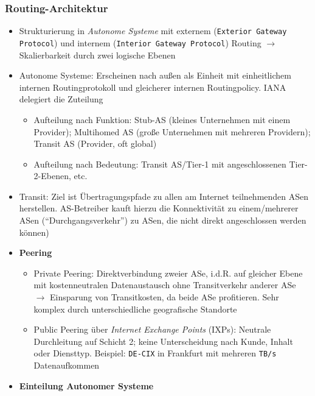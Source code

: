 \subsubsection{Routing-Architektur}
\begin{itemize}
	\item Strukturierung in \textit{Autonome Systeme} mit externem (\texttt{Exterior Gateway Protocol}) und internem (\texttt{Interior Gateway Protocol}) Routing \(\rightarrow\) Skalierbarkeit durch zwei logische Ebenen
	\item Autonome Systeme: Erscheinen nach außen als Einheit mit einheitlichem internen Routingprotokoll und gleicherer internen Routingpolicy. IANA delegiert die Zuteilung
	\begin{itemize}
		\item Aufteilung nach Funktion: Stub-AS (kleines Unternehmen mit einem Provider); Multihomed AS (große Unternehmen mit mehreren Providern); Transit AS (Provider, oft global)
		\item Aufteilung nach Bedeutung: Transit AS/Tier-1 mit angeschlossenen Tier-2-Ebenen, etc.
	\end{itemize}
	\item Transit: Ziel ist Übertragungspfade zu allen am Internet teilnehmenden ASen herstellen. AS-Betreiber kauft hierzu die Konnektivität zu einem/mehrerer ASen ("`Durchgangsverkehr"') zu ASen, die nicht direkt angeschlossen werden können)
	\item \textbf{Peering}
	\begin{itemize}
		\item Private Peering: Direktverbindung zweier ASe, i.d.R. auf gleicher Ebene mit kostenneutralen Datenaustausch ohne Transitverkehr anderer ASe \(\rightarrow\) Einsparung von Transitkosten, da beide ASe profitieren. Sehr komplex durch unterschiedliche geografische Standorte
		\item Public Peering über \textit{Internet Exchange Points} (IXPs): Neutrale Durchleitung auf Schicht 2; keine Unterscheidung nach Kunde, Inhalt oder Diensttyp. Beispiel: \texttt{DE-CIX} in Frankfurt mit mehreren \texttt{TB/s} Datenaufkommen
	\end{itemize}
	\item \textbf{Einteilung Autonomer Systeme}
\end{itemize}
